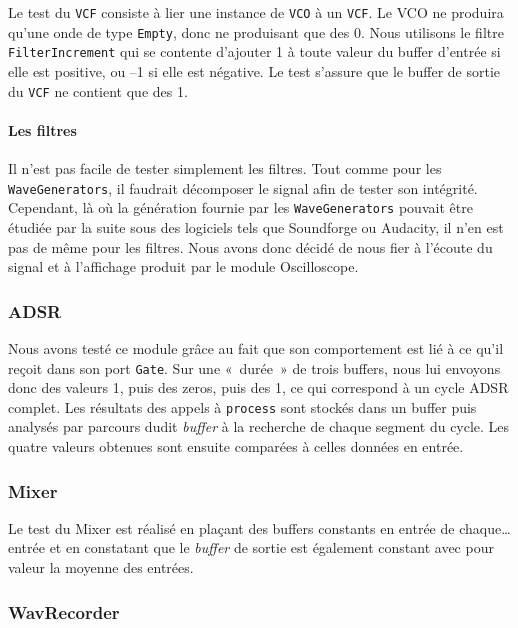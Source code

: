 {Le test du \verb!VCF! consiste à lier une instance de \verb!VCO! à
un \verb!VCF!. Le VCO ne produira qu'une onde de type \verb!Empty!,
donc ne produisant que des 0. Nous utilisons le filtre
\verb!FilterIncrement! qui se contente d'ajouter 1 à toute valeur
du buffer d'entrée si elle est positive, ou --1 si elle est
négative. Le test s'assure que le buffer de sortie du \verb!VCF! ne
contient que des 1.

\paragraph{Les filtres}

Il n'est pas facile de tester simplement les filtres. Tout comme
pour les \verb!WaveGenerators!, il faudrait décomposer le signal
afin de tester son intégrité. Cependant, là où la génération
fournie par les \verb!WaveGenerators! pouvait être étudiée par la
suite sous des logiciels tels que Soundforge ou Audacity, il n'en
est pas de même pour les filtres. Nous avons donc décidé de nous fier
à l'écoute du signal et à l’affichage produit par le module Oscilloscope.

\subsubsection{ADSR}

Nous avons testé ce module grâce au fait que son comportement est lié à ce qu'il reçoit dans son port \texttt{Gate}. Sur une «~durée~» de trois buffers, nous lui envoyons donc des valeurs 1, puis des zeros, puis des 1, ce qui correspond à un cycle ADSR complet. Les résultats des appels à \texttt{process} sont stockés dans un buffer puis analysés par parcours dudit \emph{buffer} à la recherche de chaque segment du cycle. Les quatre valeurs obtenues sont ensuite comparées à celles données en entrée.


\subsubsection{Mixer}

Le test du Mixer est réalisé en plaçant des buffers constants en entrée de chaque\dots entrée et en constatant que le \emph{buffer} de sortie est également constant avec pour valeur la moyenne des entrées.


\subsubsection{WavRecorder}

}
